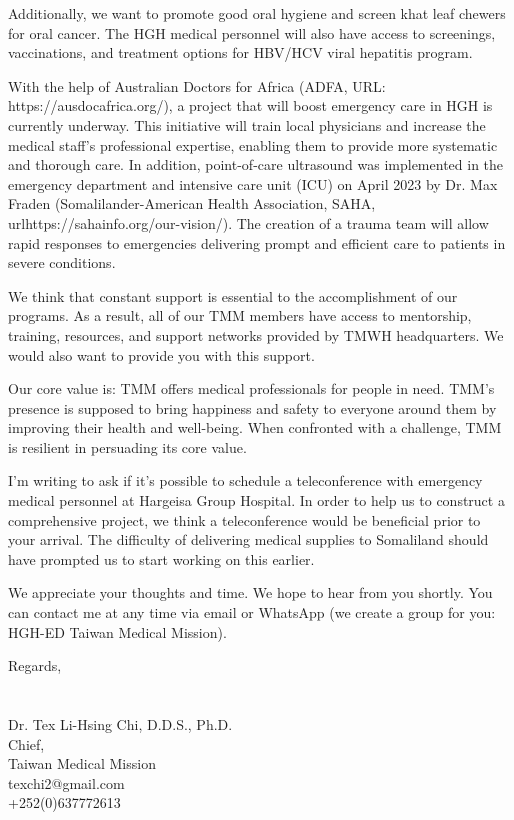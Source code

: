 \documentclass{letter}
\begin{document}
\begin{letter}
Additionally, we want to promote good oral hygiene and screen khat leaf chewers for oral cancer. 
The HGH medical personnel will also have access to screenings, vaccinations, and treatment options for HBV/HCV viral hepatitis program. 

With the help of Australian Doctors for Africa (ADFA, URL: https://ausdocafrica.org/), a project that will boost emergency care in HGH is currently underway. This initiative will train local physicians and increase the medical staff's professional expertise, enabling them to provide more systematic and thorough care. In addition, point-of-care ultrasound was implemented in the emergency department and intensive care unit (ICU) on April 2023 by Dr. Max Fraden (Somalilander-American Health Association, SAHA, urlhttps://sahainfo.org/our-vision/).
The creation of a trauma team will allow rapid responses to emergencies delivering prompt and efficient care to patients in severe conditions.

We think that constant support is essential to the accomplishment of our programs. As a result, all of our TMM members have access to mentorship, training, resources, and support networks provided by TMWH headquarters. 
We would also want to provide you with this support.

\newpage

\begin{outline}
    
Our core value is:
\1 TMM offers medical professionals for people in need.
\1 TMM's presence is supposed to bring happiness and safety to everyone around them by improving their health and well-being.
\1 When confronted with a challenge, TMM is resilient in persuading its core value.

\end{outline}

I'm writing to ask if it's possible to schedule a teleconference with emergency medical personnel at Hargeisa Group Hospital. 
In order to help us to construct a comprehensive project, we think a teleconference would be beneficial prior to your arrival. The difficulty of delivering medical supplies to Somaliland should have prompted us to start working on this earlier.


We appreciate your thoughts and time. We hope to hear from you shortly. You can contact me at any time via email or WhatsApp (we create a group for you: HGH-ED Taiwan Medical Mission).





\medskip
Regards, \\ \\ \\
Dr. Tex Li-Hsing Chi, D.D.S., Ph.D.\\
Chief, \\
Taiwan Medical Mission\\
texchi2@gmail.com\\
+252(0)637772613


\end{letter}
\end{document}
